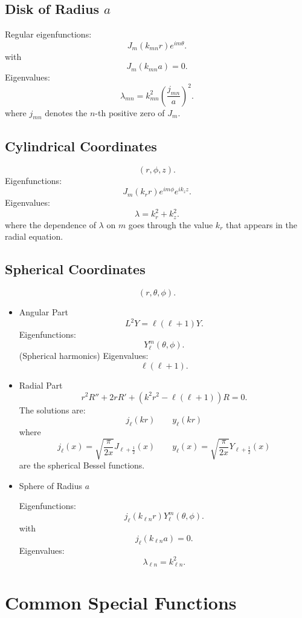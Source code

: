 \documentclass[aps,prl,twocolumn,groupedaddress]{revtex4-2}
\begin{document}
\subsection{Disk of Radius $a$}

Regular eigenfunctions:
$$
J_m(k_{mn}r)e^{im\theta}.
$$
with
$$
J_m(k_{mn}a)=0.
$$
Eigenvalues:
$$
\lambda_{mn}
=
k_{mn}^2
\left(
\frac{j_{mn}}{a}
\right)^2.
$$
where $j_{mn}$ denotes the $n$-th positive zero of $J_m$.
 
\subsection{Cylindrical Coordinates}

$$
(r,\phi,z).
$$
Eigenfunctions:
$$
J_m(k_r r)
e^{im\phi}
e^{ik_z z}.
$$
Eigenvalues:
$$
\lambda
=
k_r^2+k_z^2.
$$
where the dependence of $\lambda$ on $m$ goes through the value $k_r$ that appears in the radial equation.

\subsection{Spherical Coordinates}

$$
(r,\theta,\phi).
$$

\begin{itemize}
\item Angular Part
$$
L^2Y
=
\ell(\ell+1)Y.
$$
Eigenfunctions:
$$
Y_\ell^m(\theta,\phi).
$$
(Spherical harmonics)
Eigenvalues:
$$
\ell(\ell+1).
$$

\item Radial Part
$$
r^2R''
+
2rR'
+
\left(
k^2r^2-\ell(\ell+1)
\right)
R
=
0.
$$
The solutions are:
$$
j_\ell(kr)
\qquad
y_\ell(kr)
$$
where 
$$
j_\ell(x) = \sqrt{\frac{\pi}{2 x}}J_{\ell+\frac{1}{2}}(x)
\qquad
y_\ell(x) = \sqrt{\frac{\pi}{2 x}}Y_{\ell+\frac{1}{2}}(x)
$$
are the spherical Bessel functions.

\item Sphere of Radius $a$

Eigenfunctions:
$$
j_\ell(k_{\ell n}r)
Y_\ell^m(\theta,\phi).
$$
with
$$
j_\ell(k_{\ell n}a)=0.
$$
Eigenvalues:
$$
\lambda_{\ell n}
=
k_{\ell n}^2.
$$
\end{itemize}

\section{Common Special Functions}

\end{document}
